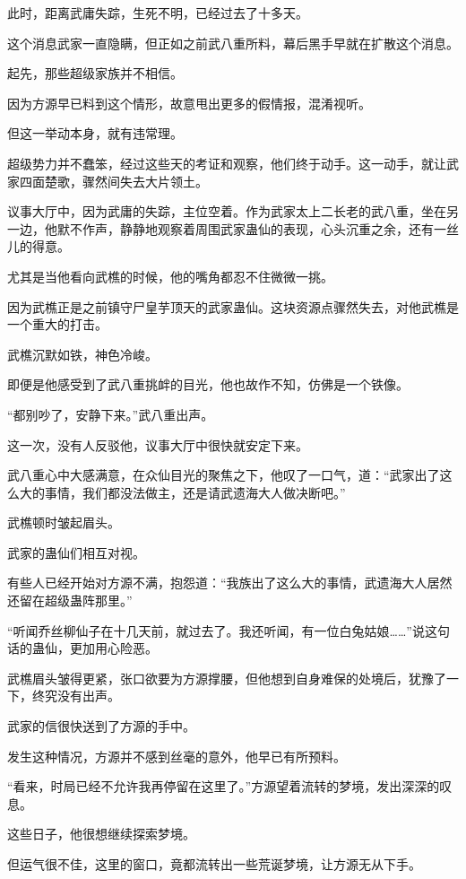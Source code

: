 \begin{this_body}
此时，距离武庸失踪，生死不明，已经过去了十多天。

这个消息武家一直隐瞒，但正如之前武八重所料，幕后黑手早就在扩散这个消息。

起先，那些超级家族并不相信。

因为方源早已料到这个情形，故意甩出更多的假情报，混淆视听。

但这一举动本身，就有违常理。

超级势力并不蠢笨，经过这些天的考证和观察，他们终于动手。这一动手，就让武家四面楚歌，骤然间失去大片领土。

议事大厅中，因为武庸的失踪，主位空着。作为武家太上二长老的武八重，坐在另一边，他默不作声，静静地观察着周围武家蛊仙的表现，心头沉重之余，还有一丝儿的得意。

尤其是当他看向武樵的时候，他的嘴角都忍不住微微一挑。

因为武樵正是之前镇守尸皇芋顶天的武家蛊仙。这块资源点骤然失去，对他武樵是一个重大的打击。

武樵沉默如铁，神色冷峻。

即便是他感受到了武八重挑衅的目光，他也故作不知，仿佛是一个铁像。

“都别吵了，安静下来。”武八重出声。

这一次，没有人反驳他，议事大厅中很快就安定下来。

武八重心中大感满意，在众仙目光的聚焦之下，他叹了一口气，道：“武家出了这么大的事情，我们都没法做主，还是请武遗海大人做决断吧。”

武樵顿时皱起眉头。

武家的蛊仙们相互对视。

有些人已经开始对方源不满，抱怨道：“我族出了这么大的事情，武遗海大人居然还留在超级蛊阵那里。”

“听闻乔丝柳仙子在十几天前，就过去了。我还听闻，有一位白兔姑娘……”说这句话的蛊仙，更加用心险恶。

武樵眉头皱得更紧，张口欲要为方源撑腰，但他想到自身难保的处境后，犹豫了一下，终究没有出声。

武家的信很快送到了方源的手中。

发生这种情况，方源并不感到丝毫的意外，他早已有所预料。

“看来，时局已经不允许我再停留在这里了。”方源望着流转的梦境，发出深深的叹息。

这些日子，他很想继续探索梦境。

但运气很不佳，这里的窗口，竟都流转出一些荒诞梦境，让方源无从下手。

\end{this_body}

